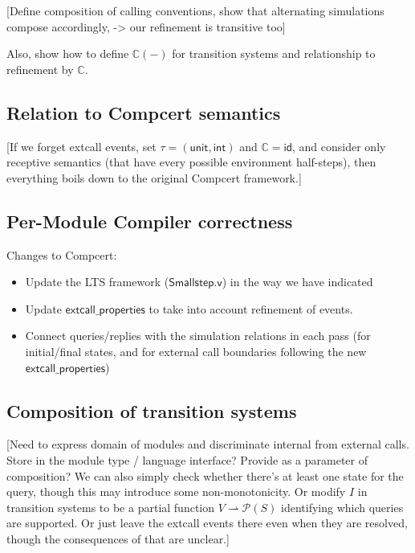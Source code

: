 \documentclass[sigplan,10pt,review,anonymous]{acmart}
\newcommand{\kw}[1]{\ensuremath{ \textsf{#1} }}
\begin{document}
[Define composition of calling conventions,
show that alternating simulations compose accordingly,
-> our refinement is transitive too]

Also, show how to define $\mathbb{C}(-)$
for transition systems
and relationship to refinement by $\mathbb{C}$.


\subsection{Relation to Compcert semantics} %

[If we forget extcall events,
set $\tau = (\kw{unit}, \kw{int})$ and $\mathbb{C} = \kw{id}$,
and consider only receptive semantics
(that have every possible environment half-steps),
then everything boils down to the original Compcert framework.]


\subsection{Per-Module Compiler correctness} %

Changes to Compcert:
\begin{itemize}
\item Update the LTS framework (\kw{Smallstep.v})
  in the way we have indicated
\item Update \kw{extcall\_properties} to take into account
  refinement of events.
\item Connect queries/replies
  with the simulation relations in each pass
  (for initial/final states, and for external call boundaries
  following the new \kw{extcall\_properties})
\end{itemize}  


\subsection{Composition of transition systems} %

[Need to express domain of modules and discriminate
internal from external calls.
Store in the module type / language interface?
Provide as a parameter of composition?
We can also simply check whether there's at least
one state for the query,
though this may introduce some non-monotonicity.
Or modify $I$ in transition systems
to be a partial function $V \rightharpoonup \mathcal{P}(S)$
identifying which queries are supported.
Or just leave the extcall events there even when
they are resolved,
though the consequences of that are unclear.]
\end{document}
